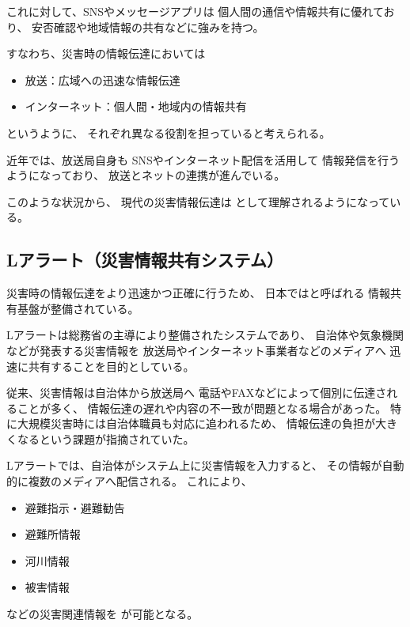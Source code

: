 これに対して、SNSやメッセージアプリは
個人間の通信や情報共有に優れており、
安否確認や地域情報の共有などに強みを持つ。

すなわち、災害時の情報伝達においては

\begin{itemize}
  \item 放送：広域への迅速な情報伝達
  \item インターネット：個人間・地域内の情報共有
\end{itemize}

というように、
それぞれ異なる役割を担っていると考えられる。

近年では、放送局自身も
SNSやインターネット配信を活用して
情報発信を行うようになっており、
放送とネットの連携が進んでいる。

このような状況から、
現代の災害情報伝達は
として理解されるようになっている。

\subsection{Lアラート（災害情報共有システム）}

災害時の情報伝達をより迅速かつ正確に行うため、
日本ではと呼ばれる
情報共有基盤が整備されている。

Lアラートは総務省の主導により整備されたシステムであり、
自治体や気象機関などが発表する災害情報を
放送局やインターネット事業者などのメディアへ
迅速に共有することを目的としている。

従来、災害情報は自治体から放送局へ
電話やFAXなどによって個別に伝達されることが多く、
情報伝達の遅れや内容の不一致が問題となる場合があった。
特に大規模災害時には自治体職員も対応に追われるため、
情報伝達の負担が大きくなるという課題が指摘されていた。

Lアラートでは、自治体がシステム上に災害情報を入力すると、
その情報が自動的に複数のメディアへ配信される。
これにより、

\begin{itemize}
  \item 避難指示・避難勧告
  \item 避難所情報
  \item 河川情報
  \item 被害情報
\end{itemize}

などの災害関連情報を
が可能となる。

